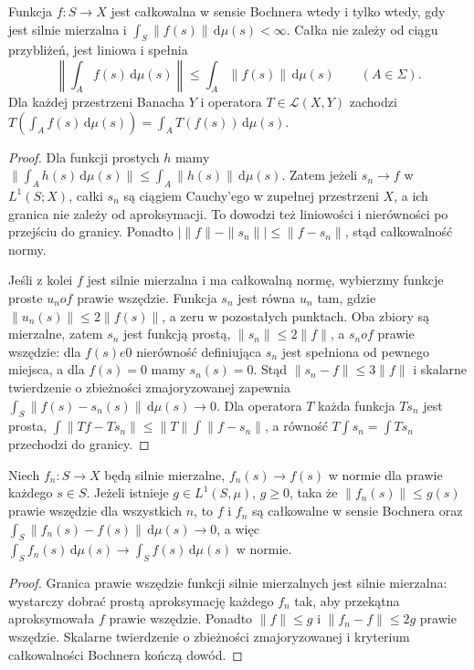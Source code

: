 \begin{twierdzenie}
\label{thm:bochner-criterion15b}
Funkcja $f:S\to X$ jest całkowalna w sensie Bochnera wtedy
i tylko wtedy, gdy jest silnie mierzalna i
$\int_S\|f(s)\|\,\mathrm d\mu(s)<\infty$.
Całka nie zależy od ciągu przybliżeń, jest liniowa i spełnia
\[
 \left\|\int_A f(s)\,\mathrm d\mu(s)\right\|
 \le\int_A\|f(s)\|\,\mathrm d\mu(s)\qquad(A\in\Sigma).
\]
Dla każdej przestrzeni Banacha $Y$ i operatora
$T\in\mathcal L(X,Y)$ zachodzi
$T(\int_A f(s)\,\mathrm d\mu(s))=\int_A T(f(s))\,\mathrm d\mu(s)$.
\end{twierdzenie}
\begin{proof}
Dla funkcji prostych $h$ mamy
$\|\int_A h(s)\,\mathrm d\mu(s)\|\le\int_A\|h(s)\|\,\mathrm d\mu(s)$.
Zatem jeżeli $s_n\to f$ w $L^1(S;X)$, całki $s_n$ są
ciągiem Cauchy'ego w zupełnej przestrzeni $X$, a ich granica
nie zależy od aproksymacji. To dowodzi też liniowości i
nierówności po przejściu do granicy. Ponadto
$|\|f\|-\|s_n\||\le\|f-s_n\|$, stąd całkowalność normy.

Jeśli z kolei $f$ jest silnie mierzalna i ma całkowalną normę,
wybierzmy funkcje proste $u_n	o f$ prawie wszędzie.
Funkcja $s_n$ jest równa $u_n$ tam, gdzie
$\|u_n(s)\|\le2\|f(s)\|$, a zeru w pozostałych punktach.
Oba zbiory są mierzalne, zatem $s_n$ jest funkcją prostą,
$\|s_n\|\le2\|f\|$, a $s_n	o f$ prawie wszędzie:
dla $f(s)
e0$ nierówność definiująca $s_n$ jest
spełniona od pewnego miejsca, a dla $f(s)=0$ mamy
$s_n(s)=0$. Stąd $\|s_n-f\|\le3\|f\|$ i skalarne
twierdzenie o zbieżności zmajoryzowanej zapewnia
$\int_S\|f(s)-s_n(s)\|\,\mathrm d\mu(s)\to0$.
Dla operatora $T$ każda funkcja $Ts_n$ jest prosta,
$\int\|Tf-Ts_n\|\le\|T\|\int\|f-s_n\|$, a równość
$T\int s_n=\int Ts_n$ przechodzi do granicy.
\end{proof}

\begin{twierdzenie}
\label{thm:bochner-dct15b}
Niech $f_n:S\to X$ będą silnie mierzalne,
$f_n(s)\to f(s)$ w normie dla prawie każdego $s\in S$.
Jeżeli istnieje $g\in L^1(S,\mu)$, $g\ge0$, taka że
$\|f_n(s)\|\le g(s)$ prawie wszędzie dla wszystkich $n$,
to $f$ i $f_n$ są całkowalne w sensie Bochnera oraz
$\int_S\|f_n(s)-f(s)\|\,\mathrm d\mu(s)\to0$, a więc
$\int_S f_n(s)\,\mathrm d\mu(s)\to\int_S f(s)\,\mathrm d\mu(s)$ w normie.
\end{twierdzenie}
\begin{proof}
Granica prawie wszędzie funkcji silnie mierzalnych jest
silnie mierzalna: wystarczy dobrać prostą aproksymację
każdego $f_n$ tak, aby przekątna aproksymowała $f$ prawie
wszędzie. Ponadto $\|f\|\le g$ i
$\|f_n-f\|\le2g$ prawie wszędzie. Skalarne twierdzenie
o zbieżności zmajoryzowanej i kryterium całkowalności
Bochnera kończą dowód.
\end{proof}

